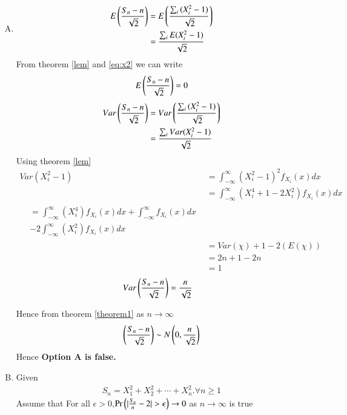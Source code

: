 \documentclass[journal,12pt,twocolumn]{IEEEtran}
\begin{document}
 \begin{enumerate}[(A)]
\item \begin{align}
    E\left(\frac{S_{n}-n}{\sqrt{2}}\right)&=E\left(\frac{\sum_{i}{(X_{i}^{2}-1)}}{\sqrt{2}}\right)\\
    &={\frac{\sum_{i}E{(X_{i}^{2}-1)}}{\sqrt{2}}}\label{eq:expectation}
\end{align}
From theorem \eqref{lem} and \eqref{eq:x2} we can write
\begin{align}
    E\left(\frac{S_{n}-n}{\sqrt{2}}\right)=0
\end{align}
\begin{align}
    Var\left(\frac{S_{n}-n}{\sqrt{2}}\right)&=Var\left(\frac{\sum_{i}{(X_{i}^{2}-1)}}{\sqrt{2}}\right)\\
    &={\frac{\sum_{i}Var{(X_{i}^{2}-1)}}{\sqrt{2}}}
\end{align}
 Using theorem \ref{lem}
\begin{align}
 Var(X_{i}^2-1)
  &=\int_{-\infty}^{\infty}(X_{i}^2-1)^2 f_{X_{i}}(x)dx\\  &=\int_{-\infty}^{\infty}(X_{i}^4+1-2X_{i}^{2})f_{X_{i}}(x)dx\\
  \begin{split}
      &=\int_{-\infty}^{\infty}(X_{i}^4)f_{X_{i}}(x)dx+\int_{-\infty}^{\infty}f_{X_{i}}(x)dx\\
      &-2\int_{-\infty}^{\infty}(X_{i}^{2})f_{X_{i}}(x)dx
  \end{split}
  \\&=Var(\chi)+1-2(E(\chi))
  \\&=2n+1-2n
\\ &=1\label{eq:var}
 
\end{align}
\begin{align}
    Var\left(\frac{S_{n}-n}{\sqrt{2}}\right)&=\frac{n}{\sqrt{2}}    
\end{align}

Hence from theorem \ref{theorem1} as $n \to \infty$
\begin{align}
    \left(\frac{S_{n}-n}{\sqrt{2}}\right)\sim N\left(0,\frac{n}{\sqrt{2}}\right)
\end{align}
Hence \textbf{Option A is false.}



\item Given 
\begin{align}
    S_{n}=X_{1}^2+X_{2}^2+\cdots+X_{n}^2.\forall n\geq 1
\end{align}
Assume that For all $\epsilon > 0$,$\Pr{\ensuremath{\left(\vert\frac{S_n}{n}-2\vert>\epsilon\right)}}\to 0$ as $n \to \infty$ is true


\end{enumerate}
\end{document}

